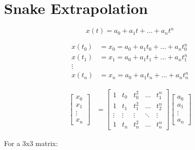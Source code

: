 \section{Snake Extrapolation}

\begin{equation}
    x(t) = a_0 + a_1t + \ldots + a_nt^n
\end{equation}

\begin{align*}
    x(t_0) &= x_0 = a_0 + a_1t_0 + \ldots + a_nt_0^n \\
    x(t_1) &= x_1 = a_0 + a_1t_1 + \ldots + a_nt_1^n \\
    \vdots & \\
    x(t_n) &= x_n = a_0 + a_1t_n + \ldots + a_nt_n^n
\end{align*}

\begin{align}
    \begin{bmatrix}
        x_0 \\ x_1 \\ \vdots \\ x_n
    \end{bmatrix}
    &=
    \begin{bmatrix}
        1      & t_0     & t_0^2     & \ldots & t_1^n \\
        1      & t_1     & t_1^2     & \ldots & t_2^n \\
        \vdots & \vdots  & \vdots    & \ddots & \vdots \\
        1      & t_n     & t_n^2     & \ldots & t_n^n
    \end{bmatrix}
    \begin{bmatrix}
        a_0 \\ a_1 \\ \vdots \\ a_n
    \end{bmatrix}
\end{align}

For a 3x3 matrix:

